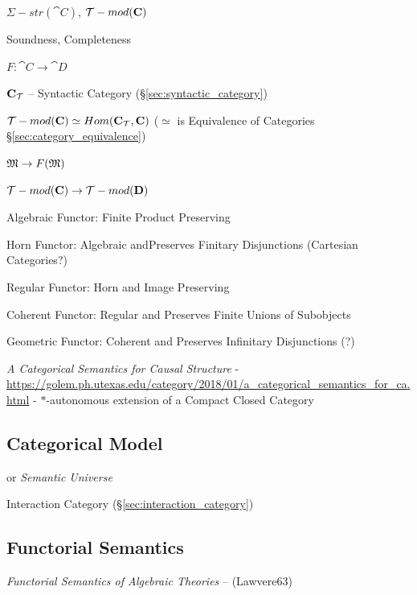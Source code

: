 $\Sigma-str(\cat{C})$, $\mathcal{T}-mod(\mathbf{C})$

Soundness, Completeness

$F : \cat{C} \rightarrow \cat{D}$

$\mathbf{C}_{\mathcal{T}}$ -- Syntactic Category
(\S\ref{sec:syntactic_category})

$\mathcal{T}-mod(\mathbf{C}) \simeq Hom(\mathbf{C}_{\mathcal{T}},\mathbf{C})$
($\simeq$ is Equivalence of Categories
\S\ref{sec:category_equivalence})

$\mathfrak{M} \rightarrow F(\mathfrak{M})$

$\mathcal{T}-mod(\mathbf{C}) \rightarrow \mathcal{T}-mod(\mathbf{D})$

Algebraic Functor: Finite Product Preserving

Horn Functor: Algebraic andPreserves Finitary Disjunctions (Cartesian
Categories?)

Regular Functor: Horn and Image Preserving

Coherent Functor: Regular and Preserves Finite Unions of Subobjects

Geometric Functor: Coherent and Preserves Infinitary Disjunctions (?)

\emph{A Categorical Semantics for Causal Structure} -
\url{https://golem.ph.utexas.edu/category/2018/01/a_categorical_semantics_for_ca.html}
- $*$-autonomous extension of a Compact Closed Category



\subsection{Categorical Model}\label{sec:categorical_model}

or \emph{Semantic Universe}

Interaction Category (\S\ref{sec:interaction_category})



\subsection{Functorial Semantics}\label{sec:functorial_semantics}

\emph{Functorial Semantics of Algebraic Theories} -- (Lawvere63)

